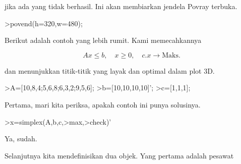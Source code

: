 \begin{eulercomment}
\begin{eulercomment}
jika ada yang tidak berhasil. Ini akan membiarkan jendela Povray
terbuka.
\end{eulercomment}
\begin{eulerprompt}
>povend(h=320,w=480);
\end{eulerprompt}
\begin{eulercomment}
Berikut adalah contoh yang lebih rumit. Kami memecahkannya

\end{eulercomment}
\begin{eulerformula}
\[
Ax \le b, \quad x \ge 0, \quad c.x \to \text{Maks.}
\]
\end{eulerformula}
\begin{eulercomment}
dan menunjukkan titik-titik yang layak dan optimal dalam plot 3D.
\end{eulercomment}
\begin{eulerprompt}
>A=[10,8,4;5,6,8;6,3,2;9,5,6];
>b=[10,10,10,10]';
>c=[1,1,1];
\end{eulerprompt}
\begin{eulercomment}
Pertama, mari kita periksa, apakah contoh ini punya solusinya.
\end{eulercomment}
\begin{eulerprompt}
>x=simplex(A,b,c,>max,>check)'
\end{eulerprompt}
\begin{euleroutput}
  [0,  1,  0.5]
\end{euleroutput}
\begin{eulercomment}
Ya, sudah.

Selanjutnya kita mendefinisikan dua objek. Yang pertama adalah pesawat


\end{eulercomment}
\end{eulercomment}
